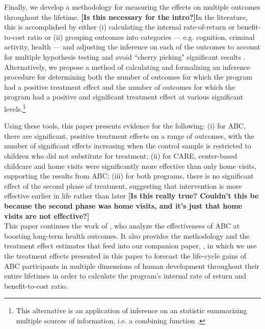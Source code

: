 Finally, we develop a methodology for measuring the effects on multiple outcomes throughout the lifetime. \textbf{[Is this necessary for the intro?]}In the literature, this is accomplished by either (i) calculating the internal rate-of-return or benefit-to-cost ratio \citep{Heckman_Moon_etal_2010_RateofReturn}  or (ii) grouping outcomes into categories –-- e.g. cognition, criminal activity, health –-- and adjusting the inference on each of the outcomes to account for multiple hypothesis testing and avoid ``cherry picking" significant results \citep{Lehman_Romano_2005_AnnStat,Lehmann_Romano_2005_testing,Heckman_Moon_etal_2010_QE}. Alternatively, we propose a method of calculating and formalizing an inference procedure for determining both the number of outcomes for which the program had a positive treatment effect and the number of outcomes for which the program had  a positive and significant treatment effect at various significant levels.\footnote{This alternative is an application of inference on an statistic summarizing multiple sources of information, i.e. a combining function \citep{Pesarin_Salmaso_2010_PermutationTests}.}

Using these tools, this paper presents evidence for the following: (i) for ABC, there are significant, positive treatment effects on a range of outcomes, with the number of significant effects increasing when the control sample is restricted to children who did not substitute for treatment; (ii) for CARE, center-based childcare and home visits were significantly more effective than only home visits, supporting the results from ABC; (iii) for both programs, there is no significant effect of the second phase of treatment, suggesting that intervention is more effective earlier in life rather than later \textbf{[Is this really true? Couldn’t this be because the second phase was home visits, and it's just that home visits are not effective?]} \\

\noindent This paper continues the work of \citet{Campbell_Conti_etal_2014_EarlyChildhoodInvestments}, who analyze the effectiveness of ABC at boosting long-term health outcomes. It also provides the methodology and the treatment effect estimates that feed into our companion paper, \citet{Elango_et_al_2015_ABC_unpublished}, in which we use the treatment effects presented in this paper to forecast the life-cycle gains of ABC participants in multiple dimensions of human development throughout their entire lifetimes in order to calculate the program's internal rate of return and benefit-to-cost ratio.\\

